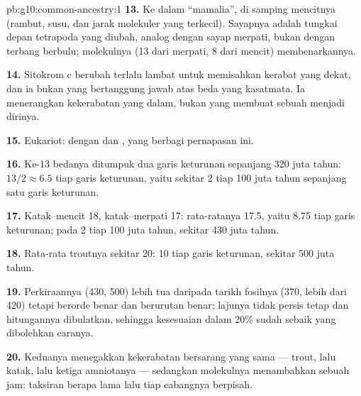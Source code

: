 \begin{solution}{pb:g10:common-ancestry:1}
\textbf{13.} Ke dalam ``mamalia'', di samping mencitnya (rambut, susu,
dan jarak molekuler yang terkecil). Sayapnya adalah tungkai depan
tetrapoda yang diubah, analog dengan sayap merpati, bukan 
dengan terbang berbulu; molekulnya (13 dari merpati, 8 dari mencit) membenarkannya.

\textbf{14.} Sitokrom c berubah terlalu lambat untuk memisahkan kerabat
yang dekat, dan ia bukan  yang bertanggung jawab atas beda yang
kasatmata. Ia menerangkan kekerabatan yang dalam, bukan  yang
membuat sebuah  menjadi dirinya.

\textbf{15.} Eukariot:  dengan  dan , yang
berbagi  pernapasan ini.

\textbf{16.} Ke-13 bedanya ditumpuk dua garis keturunan sepanjang
320 juta tahun: $13/2 \approx 6.5$ tiap garis keturunan, yaitu sekitar
2 tiap 100 juta tahun sepanjang satu garis keturunan.

\textbf{17.} Katak--mencit 18, katak--merpati 17: rata-ratanya 17.5,
yaitu 8.75 tiap garis keturunan; pada 2 tiap 100 juta tahun, sekitar
430 juta tahun.

\textbf{18.} Rata-rata troutnya sekitar 20: 10 tiap garis keturunan,
sekitar 500 juta tahun.

\textbf{19.} Perkiraannya (430, 500) lebih tua daripada tarikh fosilnya
(370, lebih dari 420) tetapi berorde benar dan berurutan benar; lajunya
tidak persis tetap dan hitungannya dibulatkan, sehingga kesesuaian
dalam 20\% sudah sebaik yang dibolehkan caranya.

\textbf{20.} Keduanya menegakkan kekerabatan bersarang yang sama ---
trout, lalu katak, lalu ketiga amniotanya --- sedangkan molekulnya
menambahkan sebuah jam: taksiran berapa lama lalu tiap cabangnya berpisah.
\end{solution}
